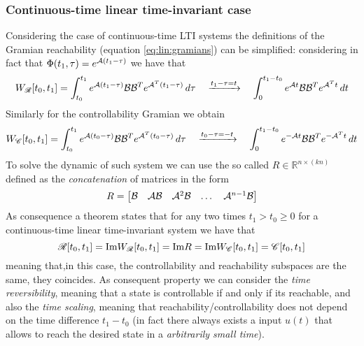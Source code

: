 	\subsubsection{Continuous-time linear time-invariant case}
		Considering the case of continuous-time LTI systems the definitions of the Gramian reachability (equation \ref{eq:lin:gramians}) can be simplified: considering in fact that $\Phi(t_1,\tau) = e^{\mathcal{A}(t_1-\tau)}$ we have that
		\begin{equation}
			W_\mathscr R[t_0,t_1] = \int_{t_0}^{t_1} e^{\mathcal{A}(t_1-\tau)} \mathcal{B} \mathcal{B}^T e^{\mathcal{A}^T(t_1-\tau)}\, d\tau \quad \xrightarrow{t_1-\tau = t} \quad \int_0^{t_1-t_0} e^{\mathcal{A} t} \mathcal{B} \mathcal{B}^T e^{\mathcal{A}^T t}\, dt
		\end{equation}
		Similarly for the controllability Gramian we obtain
		\[ W_\mathscr C[t_0,t_1] = \int_{t_0}^{t_1} e^{\mathcal{A}(t_0-\tau)} \mathcal{B} \mathcal{B}^T e^{\mathcal{A}^T(t_0-\tau)}\, d\tau \quad \xrightarrow{t_0-\tau = - t} \quad \int_0^{t_1-t_0} e^{-\mathcal{A} t} \mathcal{B} \mathcal{B}^T e^{-\mathcal{A}^T t}\, dt \]	
		To solve the dynamic of such system we can use the so called  $R\in \mathds R^{n\times (kn)}$ defined as the \textit{concatenation} of matrices in the form
		\begin{equation} \label{eq:lin:controllabilitymatrix}
			R = \begin{bmatrix}  \mathcal{B} &\mathcal{A}\mathcal{B} &\mathcal{A}^2\mathcal{B} &\dots & \mathcal{A}^{n-1}\mathcal{B}  \end{bmatrix}
		\end{equation}
		As consequence a theorem states that for any two times $t_1 > t_0 \geq 0$ for a continuous-time linear time-invariant system we have that
		\[ \mathscr R [t_0,t_1] = \textrm{Im} W_\mathscr R[t_0,t_1] = \textrm{Im} R = \textrm{Im} W_\mathscr C[t_0,t_1] = \mathscr C[t_0,t_1] \]
		meaning that,in this case, the controllability and reachability subspaces are the same, they coincides. As consequent property we can consider the \textit{time reversibility}, meaning that a state is controllable if and only if its reachable, and also the \textit{time scaling}, meaning that reachability/controllability does not depend on the time difference $t_1-t_0$ (in fact there always exists a input $u(t)$ that allows to reach the desired state in a \textit{arbitrarily small time}).
		
